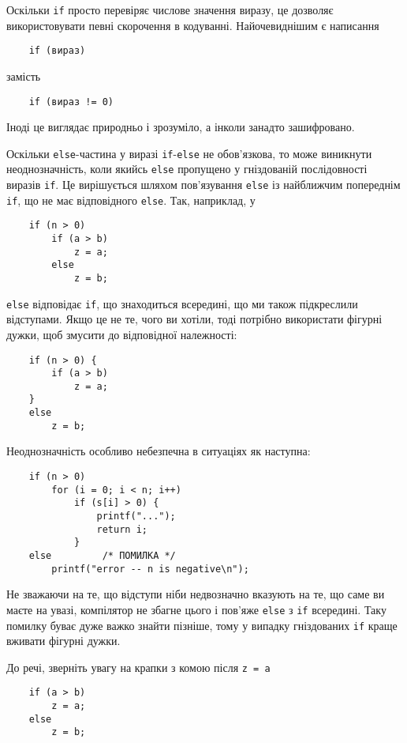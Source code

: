 \documentclass[a4paper,12pt]{book}
\begin{document}
  Оскільки
  \texttt{if} просто перевіряє числове значення виразу, це дозволяє використовувати певні
  скорочення в кодуванні. Найочевиднішим є написання
  \begin{verbatim}
    if (вираз)
  \end{verbatim}
  замість
  \begin{verbatim}
    if (вираз != 0)
  \end{verbatim}

  Іноді це виглядає природньо і зрозуміло, а інколи занадто зашифровано.

  Оскільки \texttt{else}-частина у виразі \texttt{if}-\texttt{else} не обов'язкова, то
  може виникнути неоднозначність, коли якийсь \texttt{else} пропущено у гніздованій
  послідовності виразів \texttt{if}. Це вирішується шляхом пов'язування \texttt{else} із
  найближчим попереднім \texttt{if}, що не має відповідного \texttt{else}. Так, наприклад,
  у
  \begin{verbatim}
    if (n > 0)
        if (a > b)
            z = a;
        else
            z = b;
  \end{verbatim}
  \texttt{else} відповідає
  \texttt{if}, що знаходиться всередині, що ми також підкреслили відступами. Якщо це не
  те, чого ви хотіли, тоді потрібно використати фігурні дужки, щоб змусити до відповідної
  належності:
  \begin{verbatim}
    if (n > 0) {
        if (a > b)
            z = a;
    }
    else
        z = b;
  \end{verbatim}

  Неоднозначність особливо небезпечна в ситуаціях як наступна:
  \begin{verbatim}
    if (n > 0)
        for (i = 0; i < n; i++)
            if (s[i] > 0) {
                printf("...");
                return i;
            }
    else         /* ПОМИЛКА */
        printf("error -- n is negative\n");
  \end{verbatim}

  Не зважаючи на те, що відступи ніби недвозначно вказують на те, що саме ви маєте на
  увазі, компілятор не збагне цього і пов'яже \texttt{else} з \texttt{if} всередині. Таку
  помилку буває дуже важко знайти пізніше, тому у випадку гніздованих \texttt{if} краще
  вживати фігурні дужки.

  До речі, зверніть увагу на крапки з комою після \texttt{z = a}
  \begin{verbatim}
    if (a > b)
        z = a;
    else
        z = b;
  \end{verbatim}
\end{document}
